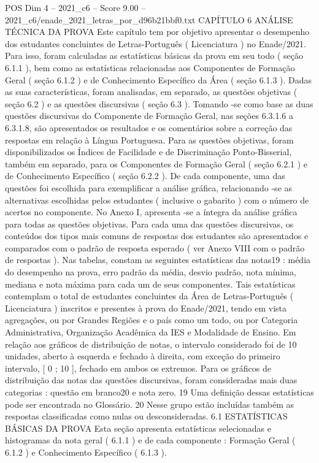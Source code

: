 \begin{textsample}{POS Dim 4 – 2021\_c6 – Score 9.00 – 2021\_c6/enade\_2021\_letras\_por\_d96b21bbf0.txt}  \label{ex:f4_pos_062}
CAPÍTULO 6 ANÁLISE TÉCNICA DA PROVA Este capítulo tem por objetivo apresentar o desempenho dos estudantes concluintes de Letras-Português ( Licenciatura ) no Enade/2021.
Para isso, foram calculadas as estatísticas básicas da prova em seu todo ( seção 6.1.1 ), bem como as estatísticas relacionadas aos Componentes de Formação Geral ( seção 6.1.2 ) e de Conhecimento Específico da Área ( seção 6.1.3 ).
Dadas as suas características, foram analisadas, em separado, as questões objetivas ( seção 6.2 ) e as questões discursivas ( seção 6.3 ).
Tomando -se como base as duas questões discursivas do Componente de Formação Geral, nas seções 6.3.1.6 a 6.3.1.8, são apresentados os resultados e os comentários sobre a correção das respostas em relação à Língua Portuguesa.
Para as questões objetivas, foram disponibilizados os Índices de Facilidade e de Discriminação Ponto-Bisserial, também em separado, para os Componentes de Formação Geral ( seção 6.2.1 ) e de Conhecimento Específico ( seção 6.2.2 ).
De cada componente, uma das questões foi escolhida para exemplificar a análise gráfica, relacionando -se as alternativas escolhidas pelos estudantes ( inclusive o gabarito ) com o número de acertos no componente.
No Anexo I, apresenta -se a íntegra da análise gráfica para todas as questões objetivas.
Para cada uma das questões discursivas, os conteúdos dos tipos mais comuns de respostas dos estudantes são apresentados e comparados com o padrão de resposta esperado ( ver Anexo VIII com o padrão de respostas ).
Nas tabelas, constam as seguintes estatísticas das notas19 : média do desempenho na prova, erro padrão da média, desvio padrão, nota mínima, mediana e nota máxima para cada um de seus componentes.
Tais estatísticas contemplam o total de estudantes concluintes da Área de Letras-Português ( Licenciatura ) inscritos e presentes à prova do Enade/2021, tendo em vista agregações, ou por Grandes Regiões e o país como um todo, ou por Categoria Administrativa, Organização Acadêmica da IES e Modalidade de Ensino.
Em relação aos gráficos de distribuição de notas, o intervalo considerado foi de 10 unidades, aberto à esquerda e fechado à direita, com exceção do primeiro intervalo, [ 0 ; 10 ], fechado em ambos os extremos.
Para os gráficos de distribuição das notas das questões discursivas, foram consideradas mais duas categorias : questão em branco20 e nota zero. 19 Uma definição dessas estatísticas pode ser encontrada no Glossário. 20 Nesse grupo estão incluídas também as respostas classificadas como nulas ou desconsideradas. 6.1 ESTATÍSTICAS BÁSICAS DA PROVA Esta seção apresenta estatísticas selecionadas e histogramas da nota geral ( 6.1.1 ) e de cada componente : Formação Geral ( 6.1.2 ) e Conhecimento Específico ( 6.1.3 ).

\end{textsample}
